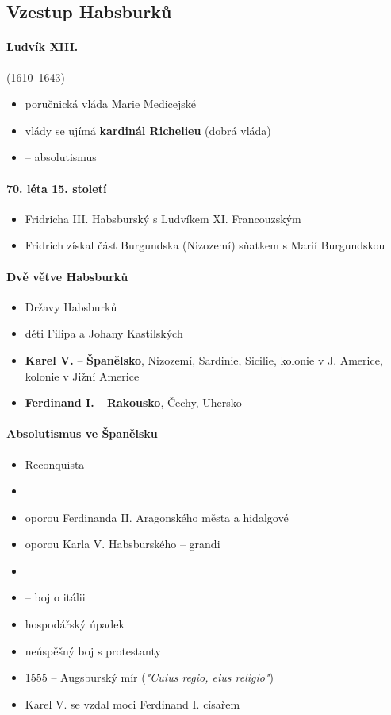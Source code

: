 \subsection{Vzestup Habsburků}
\paragraph{Ludvík XIII.} (1610--1643)
\begin{itemize}
\item poručnická vláda Marie Medicejské
\item vlády se ujímá \textbf{kardinál Richelieu} (dobrá vláda)
\item {} -- absolutismus
\end{itemize}

\paragraph{70. léta 15. století}
\begin{itemize}
\item {} Fridricha III. Habsburský s Ludvíkem XI. Francouzským
\item Fridrich získal část Burgundska (Nizozemí) sňatkem s Marií Burgundskou
\end{itemize}

\paragraph{Dvě větve Habsburků}
\begin{itemize}
\item Državy Habsburků
\item děti Filipa a Johany Kastilských 
\item \textbf{Karel V.} -- \textbf{Španělsko}, Nizozemí, Sardinie, Sicilie, kolonie v J. Americe, kolonie v Jižní Americe
\item \textbf{Ferdinand I.} -- \textbf{Rakousko}, Čechy, Uhersko
\end{itemize}

\paragraph{Absolutismus ve Španělsku}
\begin{itemize}
\item Reconquista
\item {}
\item oporou Ferdinanda II. Aragonského města a hidalgové
\item oporou Karla V. Habsburského -- grandi
\item {}
\item {} -- boj o itálii
\item hospodářský úpadek
\item neúspěšný boj s protestanty
\item 1555 -- Augsburský mír (\textit{"Cuius regio, eius religio"})
\item Karel V. se vzdal moci \ra Ferdinand I. císařem
\end{itemize}

